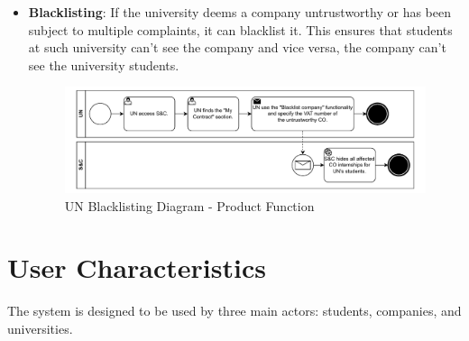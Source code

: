 \begin{itemize}
            \pagebreak

      \item \textbf{Blacklisting}: If the university deems a company untrustworthy or has been subject to multiple
            complaints, it can blacklist it. This ensures that students at such university can’t see the company and
            vice versa, the company can’t see the university students.

            \begin{figure}[H]
                  \centering
                  \includegraphics[width=1.0\textwidth]{Images/BPMN_16.pdf}
                  \caption{UN Blacklisting Diagram - Product Function}
                  \label{fig:un_blacklisting_diagram}
            \end{figure}

\end{itemize}

\section{User Characteristics}
\label{sec:user_characteristics}%

\par The system is designed to be used by three main actors: students, companies, and universities.

